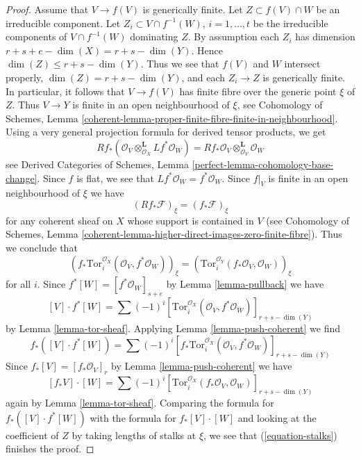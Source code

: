 \begin{proof}
\medskip\noindent
Assume that $V \to f(V)$ is generically finite. Let $Z \subset f(V) \cap W$
be an irreducible component. Let $Z_i \subset V \cap f^{-1}(W)$,
$i = 1, \ldots, t$ be the irreducible components of $V \cap f^{-1}(W)$
dominating $Z$. By assumption each $Z_i$ has dimension
$r + s + e - \dim(X) = r + s - \dim(Y)$. Hence
$\dim(Z) \leq r + s - \dim(Y)$. Thus we see that $f(V)$ and $W$
intersect properly, $\dim(Z) = r + s - \dim(Y)$, and each
$Z_i \to Z$ is generically finite. In particular, it follows that
$V \to f(V)$ has finite fibre over the generic point $\xi$ of $Z$.
Thus $V \to Y$ is finite in an open neighbourhood of $\xi$, see
Cohomology of Schemes, Lemma
\ref{coherent-lemma-proper-finite-fibre-finite-in-neighbourhood}.
Using a very general projection formula for derived tensor products, we get
$$
Rf_*(\mathcal{O}_V \otimes_{\mathcal{O}_X}^\mathbf{L} Lf^*\mathcal{O}_W) =
Rf_*\mathcal{O}_V \otimes_{\mathcal{O}_Y}^\mathbf{L} \mathcal{O}_W
$$
see Derived Categories of Schemes, Lemma
\ref{perfect-lemma-cohomology-base-change}.
Since $f$ is flat, we see that $Lf^*\mathcal{O}_W = f^*\mathcal{O}_W$.
Since $f|_V$ is finite in an open neighbourhood of $\xi$ we have
$$
(Rf_*\mathcal{F})_\xi = (f_*\mathcal{F})_\xi
$$
for any coherent sheaf on $X$ whose support is contained in $V$
(see Cohomology of Schemes, Lemma
\ref{coherent-lemma-higher-direct-images-zero-finite-fibre}). Thus
we conclude that
\begin{equation}
\label{equation-stalks}
\left(
f_*\text{Tor}_i^{\mathcal{O}_X}(\mathcal{O}_V, f^*\mathcal{O}_W)
\right)_\xi =
\left(\text{Tor}_i^{\mathcal{O}_Y}(f_*\mathcal{O}_V, \mathcal{O}_W)\right)_\xi
\end{equation}
for all $i$. Since $f^*[W] = [f^*\mathcal{O}_W]_{s + e}$ by
Lemma \ref{lemma-pullback} we have
$$
[V] \cdot f^*[W] =
\sum (-1)^i
[\text{Tor}_i^{\mathcal{O}_X}(\mathcal{O}_V,
f^*\mathcal{O}_W)]_{r + s - \dim(Y)}
$$
by Lemma \ref{lemma-tor-sheaf}. Applying
Lemma \ref{lemma-push-coherent}
we find
$$
f_*([V] \cdot f^*[W]) =
\sum (-1)^i
[f_*\text{Tor}_i^{\mathcal{O}_X}(\mathcal{O}_V,
f^*\mathcal{O}_W)]_{r + s - \dim(Y)}
$$
Since $f_*[V] = [f_*\mathcal{O}_V]_r$ by
Lemma \ref{lemma-push-coherent} we have
$$
[f_*V] \cdot [W] =
\sum (-1)^i
[\text{Tor}_i^{\mathcal{O}_X}(f_*\mathcal{O}_V,
\mathcal{O}_W)]_{r + s - \dim(Y)}
$$
again by Lemma \ref{lemma-tor-sheaf}.
Comparing the formula for $f_*([V] \cdot f^*[W])$ with
the formula for $f_*[V] \cdot [W]$ and looking at the
coefficient of $Z$ by taking lengths of stalks at $\xi$, we see that
(\ref{equation-stalks}) finishes the proof.
\end{proof}


